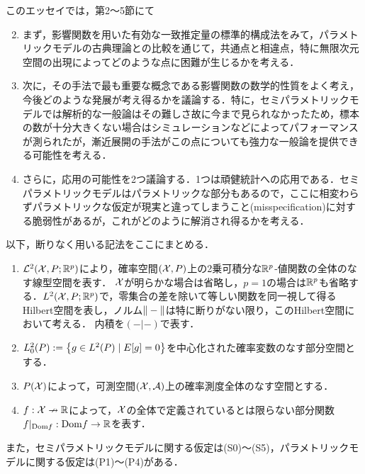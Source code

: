 \documentclass[uplatex, dvipdfmx]{jsarticle}
\begin{document}
このエッセイでは，第2〜5節にて
\begin{enumerate}[{第}1{節}]\setcounter{enumi}{1}
    \item まず，影響関数を用いた有効な一致推定量の標準的構成法をみて，パラメトリックモデルの古典理論との比較を通じて，共通点と相違点，特に無限次元空間の出現によってどのような点に困難が生じるかを考える．
    \item 次に，その手法で最も重要な概念である影響関数の数学的性質をよく考え，今後どのような発展が考え得るかを議論する．特に，セミパラメトリックモデルでは解析的な一般論はその難しさ故に今まで見られなかったため，標本の数が十分大きくない場合はシミュレーションなどによってパフォーマンスが測られたが，漸近展開の手法がこの点についても強力な一般論を提供できる可能性を考える．
    \item さらに，応用の可能性を2つ議論する．1つは頑健統計への応用である．セミパラメトリックモデルはパラメトリックな部分もあるので，ここに相変わらずパラメトリックな仮定が現実と違ってしまうこと(misspecification)に対する脆弱性があるが，これがどのように解消され得るかを考える．
\end{enumerate}

\begin{notation}
    以下，断りなく用いる記法をここにまとめる．
    \begin{enumerate}
        \item $\mathcal{L}^2(\mathcal{X},P;\mathbb{R}^p)$により，確率空間$(\mathcal{X},P)$上の2乗可積分な$\mathbb{R}^p$-値関数の全体のなす線型空間を表す．
        $\mathcal{X}$が明らかな場合は省略し，$p=1$の場合は$\mathbb{R}^p$も省略する．$L^2(\mathcal{X},P;\mathbb{R}^p)$で，零集合の差を除いて等しい関数を同一視して得るHilbert空間を表し，ノルム$\|-\|$は特に断りがない限り，このHilbert空間において考える．
        内積を$(-|-)$で表す．
        \item $L^2_0(P):=\left\{g\in L^2(P)\mid E[g]=0\right\}$を中心化された確率変数のなす部分空間とする．
        \item $P(\mathcal{X})$によって，可測空間$(\mathcal{X},\mathcal{A})$上の確率測度全体のなす空間とする．
        \item $f:\mathcal{X}\nrightarrow\mathbb{R}$によって，$\mathcal{X}$の全体で定義されているとは限らない部分関数$f|_{\mathrm{Dom} f}:\mathrm{Dom} f\to\mathbb{R}$を表す．
    \end{enumerate}
    また，セミパラメトリックモデルに関する仮定は(S0)〜(S5)，パラメトリックモデルに関する仮定は(P1)〜(P4)がある．
\end{notation}
\end{document}
